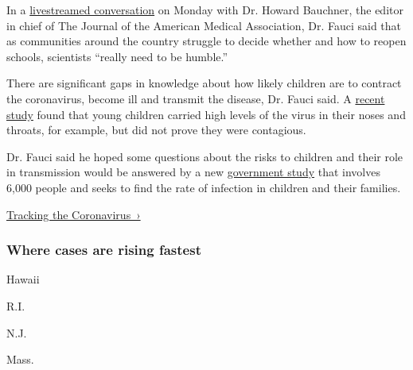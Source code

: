 In a
\href{https://www.youtube.com/watch?v=8PgmAWgiL1A\&feature=youtu.be}{livestreamed
conversation} on Monday with Dr. Howard Bauchner, the editor in chief of
The Journal of the American Medical Association, Dr. Fauci said that as
communities around the country struggle to decide whether and how to
reopen schools, scientists ``really need to be humble.''

There are significant gaps in knowledge about how likely children are to
contract the coronavirus, become ill and transmit the disease, Dr. Fauci
said. A
\href{https://www.nytimes.com/2020/07/30/health/coronavirus-children.html?searchResultPosition=1}{recent
study} found that young children carried high levels of the virus in
their noses and throats, for example, but did not prove they were
contagious.

Dr. Fauci said he hoped some questions about the risks to children and
their role in transmission would be answered by a new
\href{https://www.nih.gov/news-events/news-releases/study-determine-incidence-novel-coronavirus-infection-us-children-begins}{government
study} that involves 6,000 people and seeks to find the rate of
infection in children and their families.

\href{https://www.nytimes.com/interactive/2020/us/coronavirus-us-cases.html}{Tracking
the Coronavirus~›}

\href{https://www.nytimes.com/interactive/2020/us/coronavirus-us-cases.html}{}

\hypertarget{where-cases-are-rising-fastest}{%
\subsubsection{\texorpdfstring{Where cases are \textbf{rising}
fastest}{Where cases are rising fastest}}\label{where-cases-are-rising-fastest}}

\href{https://www.nytimes.com/interactive/2020/us/hawaii-coronavirus-cases.html}{}

Hawaii

\href{https://www.nytimes.com/interactive/2020/us/rhode-island-coronavirus-cases.html}{}

R.I.

\href{https://www.nytimes.com/interactive/2020/us/new-jersey-coronavirus-cases.html}{}

N.J.

\href{https://www.nytimes.com/interactive/2020/us/massachusetts-coronavirus-cases.html}{}

Mass.


